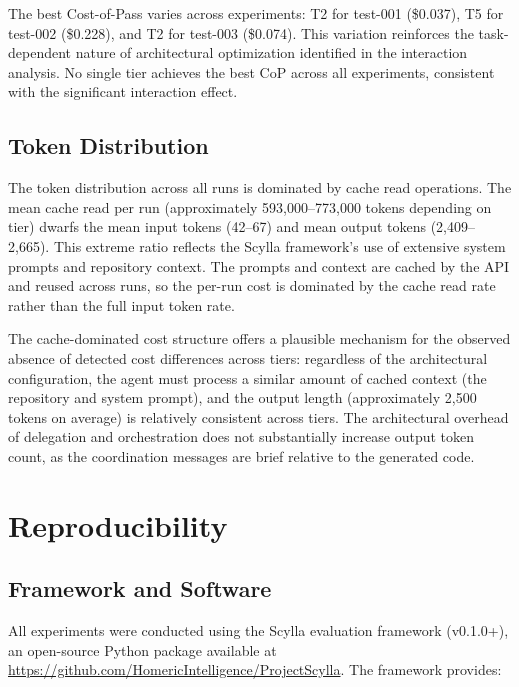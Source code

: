 \documentclass[11pt]{article}
\begin{document}
The best Cost-of-Pass varies across experiments: T2 for test-001 (\$0.037),
T5 for test-002 (\$0.228), and T2 for test-003 (\$0.074). This variation
reinforces the task-dependent nature of architectural optimization identified
in the interaction analysis. No single tier achieves the best CoP across all
experiments, consistent with the significant interaction effect.

\subsection{Token Distribution}

The token distribution across all runs is dominated by cache read operations.
The mean cache read per run (approximately 593,000--773,000 tokens depending
on tier) dwarfs the mean input tokens (42--67) and mean output tokens
(2,409--2,665). This extreme ratio reflects the Scylla framework's use of
extensive system prompts and repository context. The prompts and context are
cached by the API and reused across runs, so the per-run cost is dominated by
the cache read rate rather than the full input token rate.

The cache-dominated cost structure offers a plausible mechanism for the
observed absence of detected cost differences across tiers:
regardless of the architectural configuration, the agent must process a
similar amount of cached context (the repository and system prompt), and the
output length (approximately 2,500 tokens on average) is relatively
consistent across tiers. The architectural overhead of delegation and
orchestration does not substantially increase output token count, as the
coordination messages are brief relative to the generated code.

\section{Reproducibility}
\label{app:reproducibility}

\subsection{Framework and Software}

All experiments were conducted using the Scylla evaluation framework
(v0.1.0+), an open-source Python package available at
\url{https://github.com/HomericIntelligence/ProjectScylla}. The framework
provides:
\end{document}
